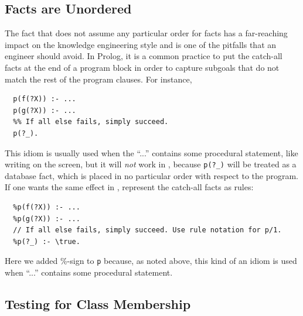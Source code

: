 \documentclass[11pt]{article}
\newcommand{\ERGO}{\mbox{\smaller{\ensuremath{\cal{E}}\smaller{{\sc{RGO}}}}}\xspace}
\newcommand{\FLSYSTEM}{\ERGO}
\begin{document}
\subsection{Facts are Unordered}

The fact that \FLSYSTEM does not assume any particular order for facts has a
far-reaching impact on the knowledge engineering style and is one of the
pitfalls that an engineer should avoid.  In Prolog, it is a
common practice to put the catch-all facts at the end of a program block in
order to capture subgoals that do not match the rest of the program
clauses. For instance,
\begin{verbatim}
  p(f(?X)) :- ...
  p(g(?X)) :- ...
  %% If all else fails, simply succeed.
  p(?_).
\end{verbatim}
This idiom is usually used when the ``...'' contains some procedural
statement, like writing on the screen, but it
will \emph{not} work in \FLSYSTEM, because {\tt p(?\_)} will be treated as a
database fact, which is placed in no particular order with respect to the
program. If one wants the same effect in \FLSYSTEM, represent the catch-all
facts as rules: 
\begin{verbatim}
  %p(f(?X)) :- ...
  %p(g(?X)) :- ...
  // If all else fails, simply succeed. Use rule notation for p/1.
  %p(?_) :- \true.
\end{verbatim}
Here we added \%-sign to \texttt{p} because, as noted above, this kind of
an idiom is used when ``...'' contains some procedural statement. 

\subsection{Testing for Class Membership}
\end{document}
